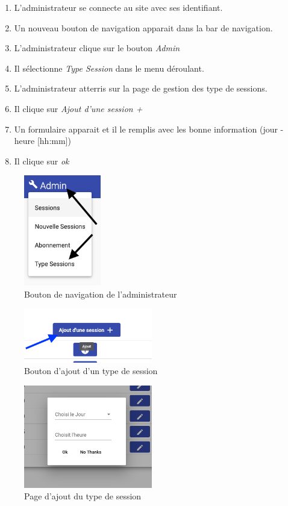\begin{enumerate}
	\item L'administrateur se connecte au site avec ses identifiant. 
	\item Un nouveau bouton de navigation apparait dans la bar de navigation. 
	\item L'administrateur clique sur le bouton \textit{Admin}
	\item Il sélectionne \textit{Type Session} dans le menu déroulant. 
	\item L'administrateur atterris sur la page de gestion des type de sessions. 
	\item Il clique sur \textit{Ajout d'une session +}
	\item Un formulaire apparait et il le remplis avec les bonne information (jour - heure [hh:mm])
	\item Il clique sur \textit{ok} 
\end{enumerate}

\vspace{\baselineskip}
\begin{figure}[h]
	\includegraphics[width=0.3\textwidth,center]{Figures/us12-1}
	\caption{Bouton de navigation de l'administrateur}
\end{figure}

\newpage
\begin{figure}[h]
	\includegraphics[width=0.5\textwidth,center]{Figures/us12-2}
	\caption{Bouton d'ajout d'un type de session}
\end{figure}

\vspace{\baselineskip}
\begin{figure}[h]
	\includegraphics[width=0.5\textwidth,center]{Figures/us12-3}
	\caption{Page d'ajout du type de session}
\end{figure}


